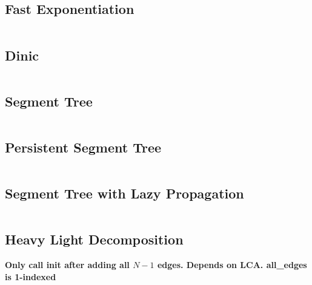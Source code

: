 \documentclass{article}
\begin{document}
\subsection{Fast Exponentiation}
\inputminted[obeytabs=true,tabsize=4]{cpp}{code/fast_exp.cpp}
\subsection{Dinic}
\inputminted[obeytabs=true,tabsize=4]{cpp}{code/dinic.cpp}
\subsection{Segment Tree} 
\inputminted[obeytabs=true,tabsize=4]{cpp}{code/seg.cpp}
\subsection{Persistent Segment Tree} 
\inputminted[obeytabs=true,tabsize=4]{cpp}{code/persistentseg.cpp}
\subsection{Segment Tree with Lazy Propagation} 
\inputminted[obeytabs=true,tabsize=4]{cpp}{code/lazyseg.cpp}
\subsection{Heavy Light Decomposition} 
\textbf{Only call init after adding all $N-1$ edges. Depends on LCA. all\_edges is 1-indexed}
\inputminted[obeytabs=true,tabsize=4]{cpp}{code/hlp.cpp}
\end{document}
